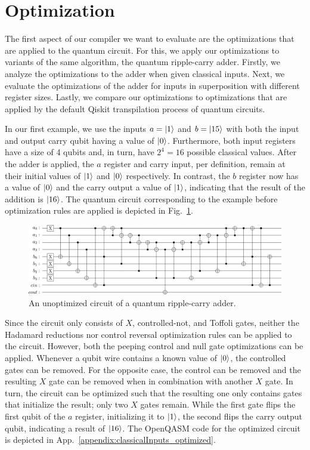 \section{Optimization}
\label{sec:eval_optimization}
The first aspect of our compiler we want to evaluate are the optimizations that are applied to the quantum circuit. For this, we apply our optimizations to variants of the same algorithm, the quantum ripple-carry adder. Firstly, we analyze the optimizations to the adder when given classical inputs. Next, we evaluate the optimizations of the adder for inputs in superposition with different register sizes. Lastly, we compare our optimizations to optimizations that are applied by the default Qiskit transpilation process of quantum circuits.

In our first example, we use the inputs $a = \ket{1}$ and $b = \ket{15}$ with both the input and output carry qubit having a value of $\ket{0}$. Furthermore, both input registers have a size of 4 qubits and, in turn, have $2^4 = 16$ possible classical values. After the adder is applied, the $a$ register and carry input, per definition, remain at their initial values of $\ket{1}$ and $\ket{0}$ respectively. In contrast, the $b$ register now has a value of $\ket{0}$ and the carry output a value of $\ket{1}$, indicating that the result of the addition is $\ket{16}$. 
The quantum circuit corresponding to the example before optimization rules are applied is depicted in Fig.~\ref{fig:eval_adder_circuit}.
\begin{figure}[htp]
    \centering     
    \includegraphics[width=\textwidth]{../figures/images/adderCircuit.png}
    \caption{An unoptimized circuit of a quantum ripple-carry adder.}
    \label{fig:eval_adder_circuit}
\end{figure}

Since the circuit only consists of $X$, controlled-not, and Toffoli gates, neither the Hadamard reductions nor control reversal optimization rules can be applied to the circuit. However, both the peeping control and null gate optimizations can be applied. Whenever a qubit wire contains a known value of $\ket{0}$,  the controlled gates can be removed. For the opposite case, the control can be removed and the resulting $X$ gate can be removed when in combination with another $X$ gate. In turn, the circuit can be optimized such that the resulting one only contains gates that initialize the result; only two $X$ gates remain. While the first gate flips the first qubit of the $a$ register, initializing it to $\ket{1}$, the second flips the carry output qubit, indicating a result of $\ket{16}$. The OpenQASM code for the optimized circuit is depicted in App.~\ref{appendix:classicalInputs_optimized}.

